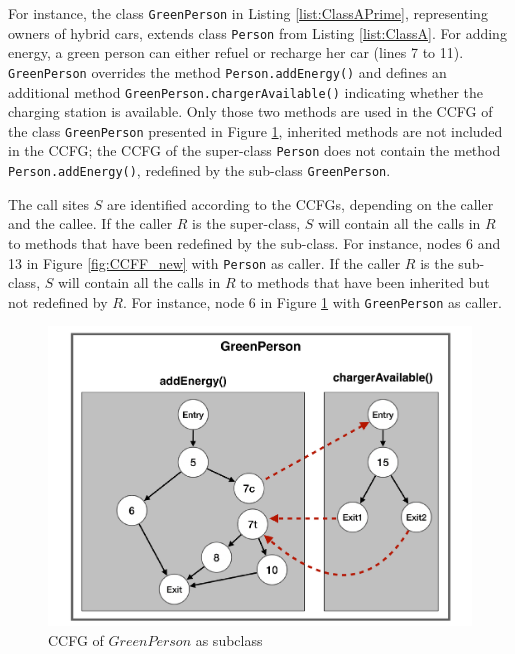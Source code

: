 For instance, the class \texttt{GreenPerson} in Listing \ref{list:ClassAPrime}, representing owners of hybrid cars, extends class \texttt{Person} from Listing \ref{list:ClassA}. For adding energy, a green person can either refuel or recharge her car (lines 7 to 11). \texttt{Green\-Person} overrides the method \texttt{Person.add\-En\-er\-gy()} and defines an additional method \texttt{Green\-Person.char\-ger\-Avai\-la\-ble()} indicating whether the charging station is available. Only those two methods are used in the CCFG of the class \texttt{Green\-Person} presented in Figure \ref{fig:greenPersonCCFG}, inherited methods are not included in the CCFG; the CCFG of the super-class \texttt{Person} does not contain the method \texttt{Person.addEnergy()}, redefined by the sub-class \texttt{GreenPerson}.

The call sites $S$ are identified according to the CCFGs, depending on the caller and the callee. If the caller $R$ is the super-class, $S$ will contain all the calls in $R$ to methods that have been redefined by the sub-class. For instance, nodes 6 and 13 in Figure \ref{fig:CCFF_new} with \texttt{Person} as caller. If the caller $R$ is the sub-class, $S$ will contain all the calls in $R$ to methods that have been inherited but not redefined by $R$. For instance, node 6 in Figure \ref{fig:greenPersonCCFG} with \texttt{GreenPerson} as caller.

\begin{figure}[!t]
    \centering
  \includegraphics[width=0.65\linewidth, angle=-90]{papers/cling/figures/GreenPerson2}
\caption{CCFG of $GreenPerson$ as subclass}
\label{fig:greenPersonCCFG}
\end{figure}
 

